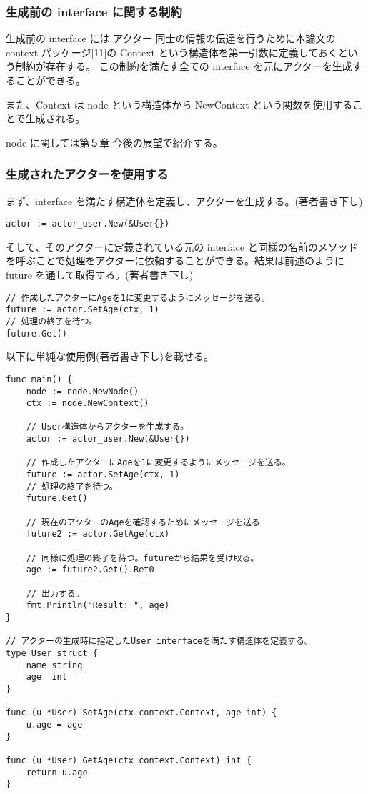 \subsubsection{生成前の interface に関する制約}

生成前の interface には アクター 同士の情報の伝達を行うために本論文の
context パッケージ{[}11{]}の Context
という構造体を第一引数に定義しておくという制約が存在する。
この制約を満たす全ての interface を元にアクターを生成することができる。

また、Context は node という構造体から NewContext
という関数を使用することで生成される。

node に関しては第５章 今後の展望で紹介する。

\subsubsection{生成されたアクターを使用する}

まず、interface
を満たす構造体を定義し、アクターを生成する。(著者書き下し)

\begin{verbatim}
actor := actor_user.New(&User{})
\end{verbatim}

そして、そのアクターに定義されている元の interface
と同様の名前のメソッドを呼ぶことで処理をアクターに依頼することができる。結果は前述のように
future を通して取得する。(著者書き下し)

\begin{verbatim}
// 作成したアクターにAgeを1に変更するようにメッセージを送る。
future := actor.SetAge(ctx, 1)
// 処理の終了を待つ。
future.Get()
\end{verbatim}

以下に単純な使用例(著者書き下し)を載せる。

\begin{verbatim}
func main() {
    node := node.NewNode()
    ctx := node.NewContext()

    // User構造体からアクターを生成する。
    actor := actor_user.New(&User{})

    // 作成したアクターにAgeを1に変更するようにメッセージを送る。
    future := actor.SetAge(ctx, 1)
    // 処理の終了を待つ。
    future.Get()

    // 現在のアクターのAgeを確認するためにメッセージを送る
    future2 := actor.GetAge(ctx)

    // 同様に処理の終了を待つ。futureから結果を受け取る。
    age := future2.Get().Ret0

    // 出力する。
    fmt.Println("Result: ", age)
}

// アクターの生成時に指定したUser interfaceを満たす構造体を定義する。
type User struct {
    name string
    age  int
}

func (u *User) SetAge(ctx context.Context, age int) {
    u.age = age
}

func (u *User) GetAge(ctx context.Context) int {
    return u.age
}
\end{verbatim}

